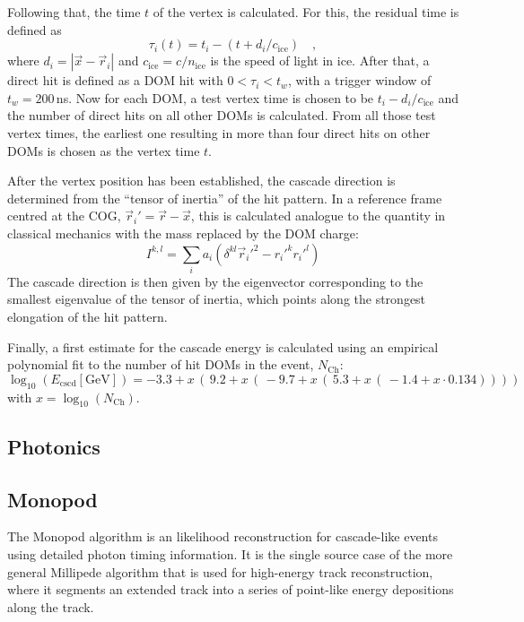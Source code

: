 Following that, the time $t$ of the vertex is calculated. For this, the residual
time is defined as
\begin{equation}
 \tau_i(t) = t_i - \left( t + d_i/c_\mathrm{ice} \right) \quad,
\end{equation}
where $d_i = | \vec{x} - \vec{r}_i |$ and $c_\mathrm{ice} = c/n_\mathrm{ice}$ is
the speed of light in ice. After that, a direct hit is defined as a DOM hit
with $0 < \tau_i < t_w$, with a trigger window of $t_w = 200$\,ns. Now for each
DOM, a test vertex time is chosen to be $t_i - d_i/c_\mathrm{ice}$ and the
number of direct hits on all other DOMs is calculated. From all those test
vertex times, the earliest one resulting in more than four direct hits on other
DOMs is chosen as the vertex time $t$.

After the vertex position has been established, the cascade direction is
determined from the ``tensor of inertia'' of the hit pattern. In a reference
frame centred at the COG, $\vec{r}_i' = \vec{r} - \vec{x}$, this is calculated
analogue to the quantity in classical mechanics with the mass replaced by the
DOM charge:
\begin{equation}
 I^{k,l} = \sum_i a_i \left(\delta^{kl} \vec{r}_i'^2 - r_i'^k r_i'^l\right)
\end{equation}
The cascade direction is then given by the eigenvector corresponding to the
smallest eigenvalue of the tensor of inertia, which points along the strongest
elongation of the hit pattern.

Finally, a first estimate for the cascade energy is calculated using an
empirical polynomial fit to the number of hit DOMs in the event,
$N_\mathrm{Ch}$:
\begin{equation}
 \log_{10}\left(E_\mathrm{cscd} [\mathrm{GeV}]\right) =
  -3.3 + x\,(\,9.2 + x\,(\,-9.7 + x\,(\,5.3 + x\,(\,-1.4 + x\cdot 0.134))))
\end{equation}
with $x = \log_{10}(N_\mathrm{Ch})$.

\subsection{Photonics}
\label{sec:reco_photonics}

\subsection{Monopod}
\label{sec:reco_monopod}

The Monopod algorithm is an likelihood reconstruction for cascade-like events
using detailed photon timing information. It is the single source case of the
more general Millipede algorithm \cite{Millipede} that is used for high-energy
track reconstruction, where it segments an extended track into a series of
point-like energy depositions along the track.

